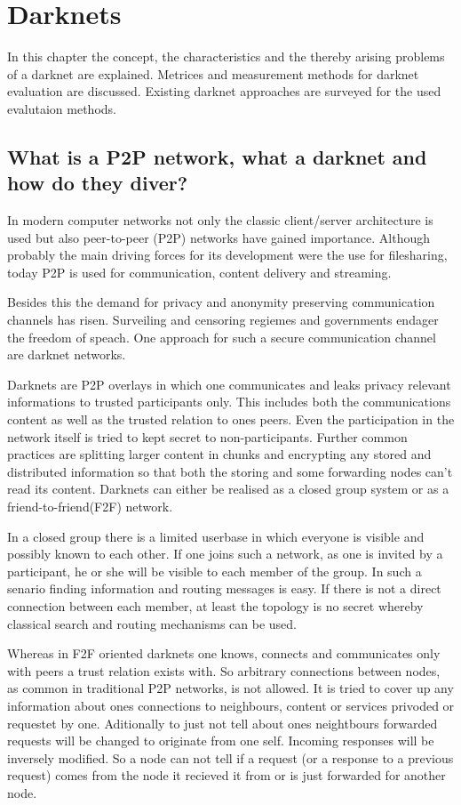 \chapter{Darknets}

In this chapter the concept, the characteristics and the thereby arising problems of a darknet are explained. Metrices and measurement methods for darknet evaluation are discussed. Existing darknet approaches are surveyed for the used evalutaion methods. 

\section{What is a P2P network, what a darknet and how do they diver?}

In modern computer networks not only the classic client/server architecture is used but also peer-to-peer (P2P) networks have gained importance. Although probably the main driving forces for its development were the use for filesharing, today P2P is used for communication, content delivery and streaming.

Besides this the demand for privacy and anonymity preserving communication channels has risen. Surveiling and censoring regiemes and governments endager the freedom of speach. One approach for such a secure communication channel are darknet networks.

Darknets are P2P overlays in which one communicates and leaks privacy relevant informations to trusted participants only. This includes both the communications content as well as the trusted relation to ones peers. Even the participation in the network itself is tried to kept secret to non-participants. Further common practices are splitting larger content in chunks and encrypting any stored and distributed information so that both the storing and some forwarding nodes can't read its content. Darknets can either be realised as a closed group system or as a friend-to-friend(F2F) network.

In a closed group there is a limited userbase in which everyone is visible and possibly known to each other. If one joins such a network, as one is invited by a participant, he or she will be visible to each member of the group. In such a senario finding information and routing messages is easy. If there is not a direct connection between each member, at least the topology is no secret whereby classical search and routing mechanisms can be used.

Whereas in F2F oriented darknets one knows, connects and communicates only with peers a trust relation exists with. So arbitrary connections between nodes, as common in traditional P2P networks, is not allowed. It is tried to cover up any information about ones connections to neighbours, content or services privoded or requestet by one. Aditionally to just not tell about ones neightbours forwarded requests will be changed to originate from one self. Incoming responses will be inversely modified. So a node can not tell if a request (or a response to a previous request) comes from the node it recieved it from or is just forwarded for another node.

